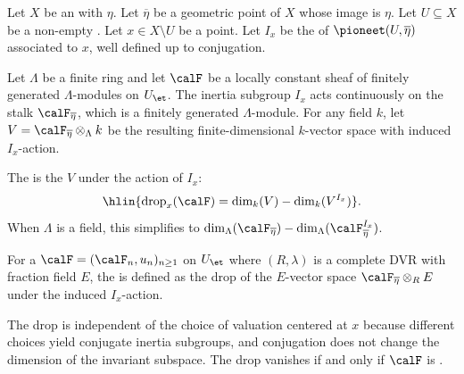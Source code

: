 \begin{definition} \label{definition:drop_of_a_lisse_sheaf_on_dense_open_of_integral_normal_scheme_at_point_in_complement}
Let $X$ be an   with  $\eta$. Let $\overline{\eta}$ be a geometric point of $X$ whose image is $\eta$. Let $U \subseteq X$ be a non-empty . Let $x \in X \setminus U$ be a point. Let $I_x$ be the  of $\pioneet(U, \overline{\eta})$ associated to $x$, well defined up to conjugation.

Let $\Lambda$ be a finite ring and let $\calF$ be a locally constant sheaf of finitely generated $\Lambda$-modules on $U_{\et}$. The inertia subgroup $I_x$ acts continuously on the stalk $\calF_{\overline{\eta}}$, which is a finitely generated $\Lambda$-module. For any field $k$, let $V = \calF_{\overline{\eta}} \otimes_\Lambda k$ be the resulting finite-dimensional $k$-vector space with induced $I_x$-action.

The  is the  $V$ under the action of $I_x$:
$$\hlin{\operatorname{drop}_x(\calF) = \dim_k(V) - \dim_k(V^{I_x})}.$$
When $\Lambda$ is a field, this simplifies to $\dim_\Lambda(\calF_{\overline{\eta}}) - \dim_\Lambda(\calF_{\overline{\eta}}^{I_x})$.

For a  $\calF = (\calF_n, u_n)_{n \geq 1}$ on $U_{\et}$ where $(R, \lambda)$ is a complete DVR with fraction field $E$, the  is defined as the drop of the $E$-vector space $\calF_{\overline{\eta}} \otimes_R E$ under the induced $I_x$-action.

The drop is independent of the choice of valuation centered at $x$ because different choices yield conjugate inertia subgroups, and conjugation does not change the dimension of the invariant subspace. The drop vanishes if and only if $\calF$ is .
\end{definition}

